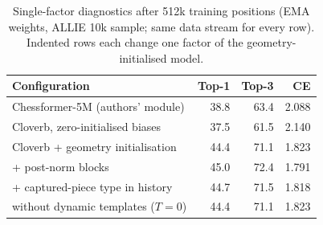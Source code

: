 \begin{table}[t]\centering\small
\caption{Single-factor diagnostics after 512k training positions (EMA weights, ALLIE 10k sample; same data stream for every row). Indented rows each change one factor of the geometry-initialised model.}\label{tab:diag}
\begin{tabular}{lrrr}\toprule
Configuration & Top-1 & Top-3 & CE\\\midrule
Chessformer-5M (authors' module) & 38.8 & 63.4 & 2.088 \\
Cloverb, zero-initialised biases & 37.5 & 61.5 & 2.140 \\
\midrule
Cloverb + geometry initialisation & 44.4 & 71.1 & 1.823 \\
\quad + post-norm blocks & 45.0 & 72.4 & 1.791 \\
\quad + captured-piece type in history & 44.7 & 71.5 & 1.818 \\
\quad without dynamic templates ($T{=}0$) & 44.4 & 71.1 & 1.823 \\
\bottomrule\end{tabular}\end{table}
